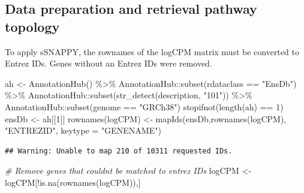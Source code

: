 \documentclass[9pt,a4paper,]{extarticle}
\newenvironment{Shaded}{\begin{snugshade}}{\end{snugshade}}
\newcommand{\AttributeTok}[1]{\textcolor[rgb]{0.77,0.63,0.00}{#1}}
\newcommand{\CommentTok}[1]{\textcolor[rgb]{0.56,0.35,0.01}{\textit{#1}}}
\newcommand{\DecValTok}[1]{\textcolor[rgb]{0.00,0.00,0.81}{#1}}
\newcommand{\FunctionTok}[1]{\textcolor[rgb]{0.00,0.00,0.00}{#1}}
\newcommand{\NormalTok}[1]{#1}
\newcommand{\OtherTok}[1]{\textcolor[rgb]{0.56,0.35,0.01}{#1}}
\newcommand{\SpecialCharTok}[1]{\textcolor[rgb]{0.00,0.00,0.00}{#1}}
\newcommand{\StringTok}[1]{\textcolor[rgb]{0.31,0.60,0.02}{#1}}
\begin{document}
\hypertarget{data-preparation-and-retrieval-pathway-topology}{%
\subsection{Data preparation and retrieval pathway topology}\label{data-preparation-and-retrieval-pathway-topology}}

To apply sSNAPPY, the rownames of the logCPM matrix must be converted to Entrez IDs. Genes without an Entrez IDs were removed.

\begin{Shaded}
\begin{Highlighting}[]
\NormalTok{ah }\OtherTok{\textless{}{-}} \FunctionTok{AnnotationHub}\NormalTok{() }\SpecialCharTok{\%\textgreater{}\%}
\NormalTok{  AnnotationHub}\SpecialCharTok{::}\FunctionTok{subset}\NormalTok{(rdataclass }\SpecialCharTok{==} \StringTok{"EnsDb"}\NormalTok{) }\SpecialCharTok{\%\textgreater{}\%}
\NormalTok{  AnnotationHub}\SpecialCharTok{::}\FunctionTok{subset}\NormalTok{(}\FunctionTok{str\_detect}\NormalTok{(description, }\StringTok{"101"}\NormalTok{)) }\SpecialCharTok{\%\textgreater{}\%}
\NormalTok{  AnnotationHub}\SpecialCharTok{::}\FunctionTok{subset}\NormalTok{(genome }\SpecialCharTok{==} \StringTok{"GRCh38"}\NormalTok{)}
\FunctionTok{stopifnot}\NormalTok{(}\FunctionTok{length}\NormalTok{(ah) }\SpecialCharTok{==} \DecValTok{1}\NormalTok{)}
\NormalTok{ensDb }\OtherTok{\textless{}{-}}\NormalTok{ ah[[}\DecValTok{1}\NormalTok{]]}
\FunctionTok{rownames}\NormalTok{(logCPM) }\OtherTok{\textless{}{-}} \FunctionTok{mapIds}\NormalTok{(ensDb,}\FunctionTok{rownames}\NormalTok{(logCPM), }
                           \StringTok{"ENTREZID"}\NormalTok{, }\AttributeTok{keytype =} \StringTok{"GENENAME"}\NormalTok{)}
\end{Highlighting}
\end{Shaded}

\begin{verbatim}
## Warning: Unable to map 210 of 10311 requested IDs.
\end{verbatim}

\begin{Shaded}
\begin{Highlighting}[]
\CommentTok{\# Remove genes that couldn\textquotesingle{}t be matched to entrez IDs}
\NormalTok{logCPM }\OtherTok{\textless{}{-}}\NormalTok{ logCPM[}\SpecialCharTok{!}\FunctionTok{is.na}\NormalTok{(}\FunctionTok{rownames}\NormalTok{(logCPM)),]}
\end{Highlighting}
\end{Shaded}
\end{document}
